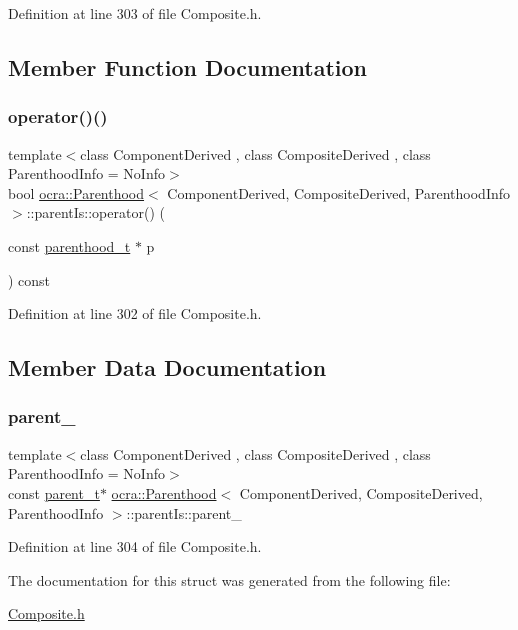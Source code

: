 Definition at line 303 of file Composite.\+h.



\subsection{Member Function Documentation}
\hypertarget{structocra_1_1Parenthood_1_1parentIs_ad780e02e2e27c53bff75fb0ab0ea245e}{}\label{structocra_1_1Parenthood_1_1parentIs_ad780e02e2e27c53bff75fb0ab0ea245e} 
\subsubsection{\texorpdfstring{operator()()}{operator()()}}
{\footnotesize\ttfamily template$<$class Component\+Derived , class Composite\+Derived , class Parenthood\+Info  = No\+Info$>$ \\
bool \hyperlink{classocra_1_1Parenthood}{ocra\+::\+Parenthood}$<$ Component\+Derived, Composite\+Derived, Parenthood\+Info $>$\+::parent\+Is\+::operator() (\begin{DoxyParamCaption}\item[{const \hyperlink{classocra_1_1Parenthood_acdae20cb747190b5dc9dbe42290bde78}{parenthood\+\_\+t} $\ast$}]{p }\end{DoxyParamCaption}) const\hspace{0.3cm}{\ttfamily [inline]}}



Definition at line 302 of file Composite.\+h.



\subsection{Member Data Documentation}
\hypertarget{structocra_1_1Parenthood_1_1parentIs_a1c5033667c6742b8f4ba326918eb1f4d}{}\label{structocra_1_1Parenthood_1_1parentIs_a1c5033667c6742b8f4ba326918eb1f4d} 
\subsubsection{\texorpdfstring{parent\+\_\+}{parent\_}}
{\footnotesize\ttfamily template$<$class Component\+Derived , class Composite\+Derived , class Parenthood\+Info  = No\+Info$>$ \\
const \hyperlink{classocra_1_1Parenthood_a2f95265c57cf96bbc26afee2ac757dd6}{parent\+\_\+t}$\ast$ \hyperlink{classocra_1_1Parenthood}{ocra\+::\+Parenthood}$<$ Component\+Derived, Composite\+Derived, Parenthood\+Info $>$\+::parent\+Is\+::parent\+\_\+}



Definition at line 304 of file Composite.\+h.



The documentation for this struct was generated from the following file\+:\begin{DoxyCompactItemize}
\item 
\hyperlink{Composite_8h}{Composite.\+h}\end{DoxyCompactItemize}

